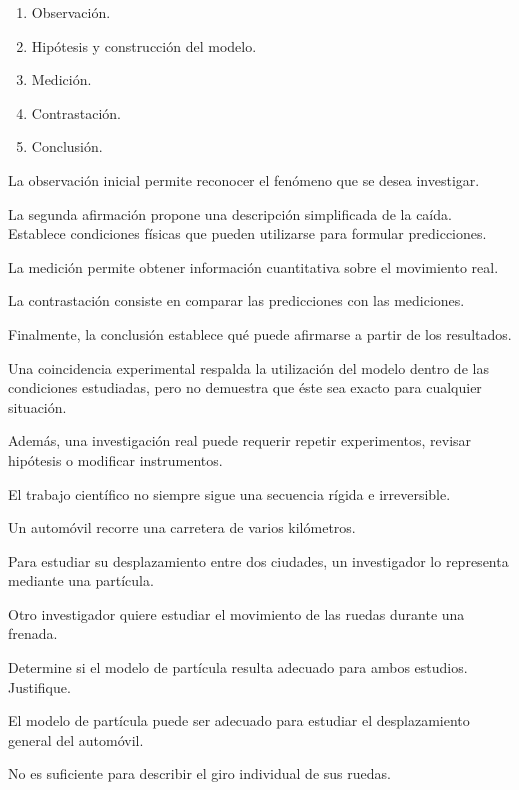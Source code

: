 \begin{respuesta}
\begin{enumerate}[label=\alph*)]
    \item Observación.
    \item Hipótesis y construcción del modelo.
    \item Medición.
    \item Contrastación.
    \item Conclusión.
\end{enumerate}
\end{respuesta}

\begin{explicacion}
La observación inicial permite reconocer el fenómeno que se desea investigar.

La segunda afirmación propone una descripción simplificada de la caída. Establece condiciones físicas que pueden utilizarse para formular predicciones.

La medición permite obtener información cuantitativa sobre el movimiento real.

La contrastación consiste en comparar las predicciones con las mediciones.

Finalmente, la conclusión establece qué puede afirmarse a partir de los resultados.

Una coincidencia experimental respalda la utilización del modelo dentro de las condiciones estudiadas, pero no demuestra que éste sea exacto para cualquier situación.

Además, una investigación real puede requerir repetir experimentos, revisar hipótesis o modificar instrumentos.

El trabajo científico no siempre sigue una secuencia rígida e irreversible.
\end{explicacion}


\begin{ejercicio}
Un automóvil recorre una carretera de varios kilómetros.

Para estudiar su desplazamiento entre dos ciudades, un investigador lo representa mediante una partícula.

Otro investigador quiere estudiar el movimiento de las ruedas durante una frenada.

Determine si el modelo de partícula resulta adecuado para ambos estudios. Justifique.
\end{ejercicio}

\begin{respuesta}
El modelo de partícula puede ser adecuado para estudiar el desplazamiento general del automóvil.

No es suficiente para describir el giro individual de sus ruedas.
\end{respuesta}

